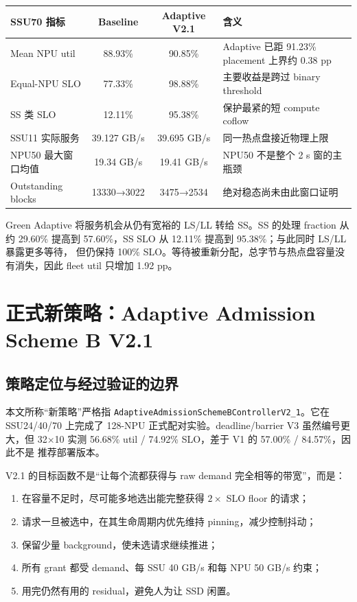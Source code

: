 \documentclass[UTF8,fontset=none,10pt,a4paper]{ctexart}
\newcommand{\code}[1]{\texttt{\small #1}}
\begin{document}
\begin{tabularx}{\textwidth}{p{36mm} C C Y}
\toprule
SSU70 指标 & Baseline & Adaptive V2.1 & 含义\\
\midrule
Mean NPU util & 88.93\% & 90.85\% & Adaptive 已距 91.23\% placement 上界约 0.38 pp\\
Equal-NPU SLO & 77.33\% & 98.88\% & 主要收益是跨过 binary threshold\\
SS 类 SLO & 12.11\% & 95.38\% & 保护最紧的短 compute coflow\\
SSU11 实际服务 & 39.127 GB/s & 39.695 GB/s & 同一热点盘接近物理上限\\
NPU50 最大窗口均值 & 19.34 GB/s & 19.41 GB/s & NPU50 不是整个 2 s 窗的主瓶颈\\
Outstanding blocks & 13330→3022 & 3475→2534 & 绝对稳态尚未由此窗口证明\\
\bottomrule
\end{tabularx}

\begin{insightbox}[title={为什么动态策略的 SLO 大涨、util 只小涨}]{Green}
Adaptive 将服务机会从仍有宽裕的 LS/LL 转给 SS。SS 的处理 fraction 从约 29.60\%
提高到 57.60\%，SS SLO 从 12.11\% 提高到 95.38\%；与此同时 LS/LL 暴露更多等待，
但仍保持 100\% SLO。等待被重新分配，总字节与热点盘容量没有消失，因此 fleet util
只增加 1.92 pp。
\end{insightbox}

\section{正式新策略：Adaptive Admission Scheme B V2.1}

\subsection{策略定位与经过验证的边界}

本文所称“新策略”严格指 \code{AdaptiveAdmissionSchemeBControllerV2\_1}。它在
SSU24/40/70 上完成了 128-NPU 正式配对实验。deadline/barrier V3 虽然编号更大，但
32×10 实测 56.68\% util / 74.92\% SLO，差于 V1 的 57.00\% / 84.57\%，因此不是
推荐部署版本。

V2.1 的目标函数不是“让每个流都获得与 raw demand 完全相等的带宽”，而是：

\begin{enumerate}[label=\textbf{\arabic*.}]
  \item 在容量不足时，尽可能多地选出能完整获得 $2\times$ SLO floor 的请求；
  \item 请求一旦被选中，在其生命周期内优先维持 pinning，减少控制抖动；
  \item 保留少量 background，使未选请求继续推进；
  \item 所有 grant 都受 demand、每 SSU 40 GB/s 和每 NPU 50 GB/s 约束；
  \item 用完仍然有用的 residual，避免人为让 SSD 闲置。
\end{enumerate}
\end{document}
